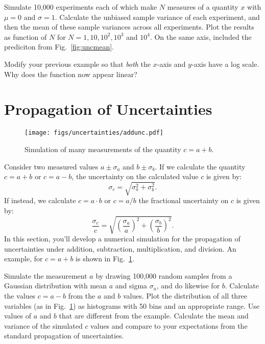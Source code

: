 \begin{plot}\end{plot}
Simulate 10,000 experiments each of which make $N$ measures of a
quantity $x$ with $\mu=0$ and $\sigma=1$.  Calculate the unbiased
sample variance of each experiment, and then the mean of these sample
variances across all experiments.  Plot the results as function of $N$
for $N=1,10,10^2,10^3$ and $10^4$.  On the same axis, included the
prediciton from Fig.~\ref{fig:uncmean}.


\begin{plot}\end{plot}
Modify your previous example so that {\em both} the $x$-axis and
$y$-axis have a log scale.  Why does the function now appear linear?

\section{Propagation of Uncertainties}

\begin{figure}[htbp]
\begin{center}
\texttt{[image: figs/uncertainties/addunc.pdf]}\\
\end{center}
\caption{\label{fig:addunc} Simulation of many measurements of the quantity $c = a + b$. }
\end{figure}

Consider two measured values $a \pm \sigma_a$ and $b \pm \sigma_b$.  If we calculate the quantity $c = a + b$ or $c = a - b$, the uncertainty on the calculated value $c$ is given by:
\begin{displaymath}
\sigma_c = \sqrt{\sigma_a^2 + \sigma_b^2}.
\end{displaymath}
If instead, we calculate $c = a \cdot b$ or $c = a/b$ the fractional uncertainty on $c$ is given by:
\begin{displaymath}
\frac{\sigma_c}{c} = \sqrt{\left(\frac{\sigma_a}{a}\right)^2 + \left(\frac{\sigma_b}{b}\right)^2}.
\end{displaymath}
In this section, you'll develop a numerical simulation for the
propagation of uncertainties under addition, subtraction,
multiplication, and division.  An example, for $c = a + b$ is shown in Fig.~\ref{fig:addunc}.

\begin{plot} \end{plot}
Simulate the measurement $a$ by drawing 100,000 random samples from a
Gaussian distribution with mean $a$ and sigma $\sigma_a$, and do
likewise for $b$.  Calculate the values $c = a -b $ from the $a$ and
$b$ values.  Plot the distribution of all three variables (as in
Fig.~\ref{fig:addunc}) as histograms with 50 bins and an appropriate
range.  Use values of $a$ and $b$ that are different from the example.
Calculate the mean and variance of the simulated $c$ values
and compare to your expectations from the standard propagation of
uncertainties.

